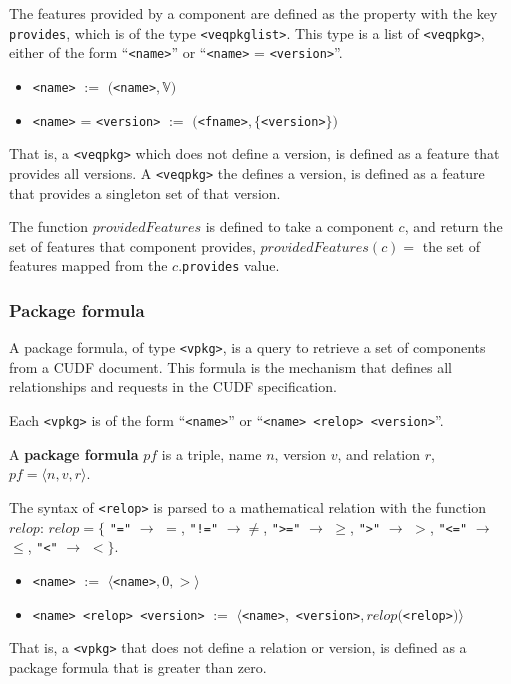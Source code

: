 The features provided by a component are defined as the property with the key \verb+provides+, which is of the type \texttt{<veqpkglist>}.
This type is a list of \texttt{<veqpkg>}, either of the form ``\verb+<name>+'' or  ``\verb+<name>+ = \verb+<version>+''.
\begin{itemize}
  \item \verb+<name>+ $:=$ $($\verb+<name>+$,\mathbb{V})$
  \item \verb+<name>+ = \verb+<version>+ $:=$ $($\verb+<fname>+$,\{$\verb+<version>+$\})$
\end{itemize}
That is, a \texttt{<veqpkg>} which does not define a version, is defined as a feature that provides all versions.
A  \texttt{<veqpkg>} the defines a version, is defined as a feature that provides a singleton set of that version.

\begin{defs}
The function $providedFeatures$ is defined to take a component $c$, and return the set of features that component provides,
$providedFeatures(c) =$ the set of features mapped from the $c$.\texttt{provides} value.
\end{defs}

\subsubsection{Package formula}
A package formula, of type \texttt{<vpkg>}, is a query to retrieve a set of components from a CUDF document.
This formula is the mechanism that defines all relationships and requests in the CUDF specification.

Each \texttt{<vpkg>} is of the form ``\texttt{<name>}'' or  ``\texttt{<name> <relop> <version>}''.
\begin{defs}
A \textbf{package formula} $pf$ is a triple, name $n$, version $v$, and relation $r$, $pf = \langle n, v , r \rangle$.
\end{defs}

The syntax of \verb+<relop>+ is parsed to a mathematical relation with the function $relop$:  
$relop = \{$ \verb+"="+ $\rightarrow$ $=$, \verb+"!="+ $\rightarrow \not =$, 
\verb+">="+ $\rightarrow$ $\geq$, \verb+">"+ $\rightarrow$ $>$, \verb+"<="+ $\rightarrow$ $\leq$, \verb+"<"+ $\rightarrow$ $<$$\}$.

\begin{itemize}
  \item \texttt{<name>} $:=$ $\langle $\texttt{<name>}$, 0 , > \rangle$
  \item \texttt{<name> <relop> <version>} $:=$ $\langle $\texttt{<name>}$,$ \texttt{<version>}$, relop($\texttt{<relop>}$) \rangle$
\end{itemize}
That is, a \texttt{<vpkg>} that does not define a relation or version, is defined as a package formula that is greater than zero.

